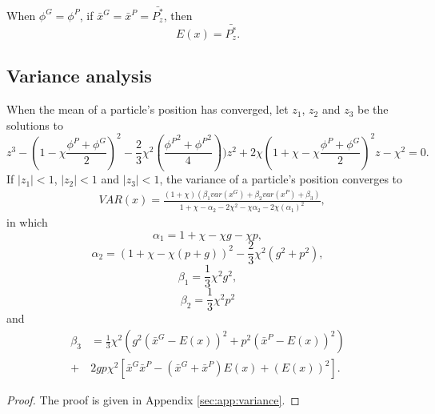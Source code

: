\documentclass[12pt]{article}
\begin{document}
\begin{coro}
When $ \phi^{G} = \phi^{P} $,
if $ \bar{x}^{G} = \bar{x}^{P} = \bar{P^{*}_{z}} $,
then
\begin{equation}
E(x) = \bar{P^{*}_{z}}.
\end{equation}
\end{coro}



\subsection{Variance analysis}

\begin{thm}
\label{thm:var_analysis}
When the mean of a particle's position has converged, 
let $ z_{1} $, $ z_{2} $ and $ z_{3} $ be the solutions to 
\begin{equation}
z^{3} - (1 - \chi \frac{ \phi^{P} + \phi^{G} }{2} )^{2} - \frac{2}{3} \chi^{2} ( \frac{ {\phi^{P}}^{2} + {\phi^{P}}^{2} }{4} ) ) z^{2} + 2 \chi ( 1 + \chi - \chi \frac{ \phi^{P} + \phi^{G} }{2} )^{2} z - \chi^{2} = 0.
\end{equation}
If $ | z_{1} | < 1  $, $ | z_{2} | < 1 $ and $ | z_{3} | < 1 $,
the variance of a particle's position converges to
\begin{equation}
\label{eq:var_rel}
\begin{aligned}
& VAR(x) = \frac{(1 + \chi) ( \beta_{1} var(x^{G}) + \beta_{2} var(x^{P}) + \beta_{3} ) }{1 + \chi - \alpha_{2} - 2 \chi^{2} - \chi \alpha_{2} - 2 \chi ( \alpha_{1} )^{2} },
\end{aligned}
\end{equation}
in which 
\begin{equation}
\alpha_{1} =  1 + \chi - \chi g - \chi p,
\end{equation}
\begin{equation}
\alpha_{2} = (1 + \chi - \chi ( p + g ))^{2} - \frac{2}{3} \chi^{2} ( g^{2} + p^{2} ), 
\end{equation}
\begin{equation}
\beta_{1} = \frac{1}{3} \chi^{2} g^{2},
\end{equation}
\begin{equation}
\beta_{2} = \frac{1}{3} \chi^{2} p^{2}
\end{equation}
and
\begin{equation}
\begin{aligned}
\beta_{3} & = \frac{1}{3} \chi^{2} ( g^{2} (  \bar{x}^{G} - E(x) )^{2}  + p^{2} ( \bar{x}^{P} - E(x) )^{2} ) \\
 + & 2 g p \chi^{2} [ \bar{x}^{G} \bar{x}^{P} - ( \bar{x}^{G} + \bar{x}^{P} ) E(x) + ( E(x) )^{2} ].
 \end{aligned}
\end{equation}

\begin{proof}
The proof is given in Appendix \ref{sec:app:variance}.
\end{proof}
\end{thm}
\end{document}
